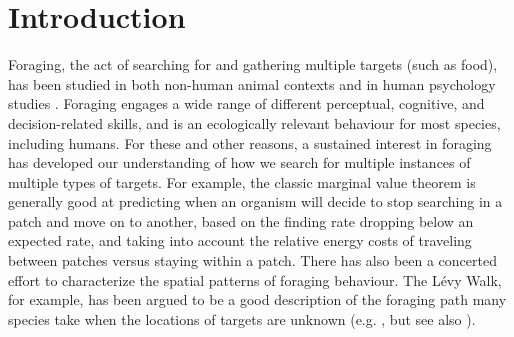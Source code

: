 \documentclass[preprints, article,submit,pdftex,moreauthors]{Definitions/mdpi}
\begin{document}



\section{Introduction}

Foraging, the act of searching for and gathering multiple targets (such as food), has been studied in both non-human animal contexts \cite{dawkins1971} and in human psychology studies \cite{kristjansson2014}. Foraging engages a wide range of different perceptual, cognitive, and decision-related skills, and is an ecologically relevant behaviour for most species, including humans. For these and other reasons, a sustained interest in foraging has developed our understanding of how we search for multiple instances of multiple types of targets. For example, the classic marginal value theorem \cite {charnov1976} is generally good at predicting when an organism will decide to stop searching in a patch and move on to another, based on the finding rate dropping below an expected rate, and taking into account the relative energy costs of traveling between patches versus staying within a patch. There has also been a concerted effort to characterize the spatial patterns of foraging behaviour. The Lévy Walk, for example, has been argued to be a good description of the foraging path many species take when the locations of targets are unknown (e.g. \citep {bartumeus2005}, but see also \citep{benhamou2007}). 
\end{document}
